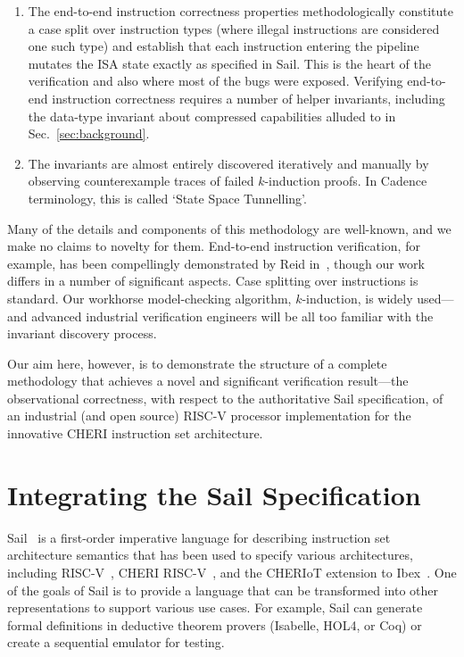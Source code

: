 \documentclass[10pt,conference]{IEEEtran}
\begin{document}
\begin{enumerate}
  \item \label{end-to-end} The end-to-end instruction correctness
    properties methodologically constitute a case split over instruction
    types (where illegal instructions are considered one such type)
    and establish that each instruction entering the
    pipeline mutates the ISA state exactly as specified in Sail. This is
    the heart of the verification and also where most of the bugs were
    exposed.  Verifying end-to-end instruction correctness requires a
    number of helper invariants, including the data-type invariant about
    compressed capabilities alluded to in Sec.~\ref{sec:background}.
  \item \label{invariant} The invariants are almost entirely discovered iteratively and
    manually by observing counterexample traces of failed $k$-induction
    proofs. In Cadence terminology, this is called `State Space Tunnelling'.
\end{enumerate}

Many of the details and components of this methodology are
well-known, and we make no claims to novelty for them. End-to-end
instruction verification, for example, has been compellingly demonstrated
by Reid in~\cite{Reid-2016-EEV}, though our work differs in a number of
significant aspects. Case splitting over instructions is
standard. Our workhorse model-checking algorithm, $k$-induction, is widely
used---and advanced industrial verification engineers will be all too
familiar with the invariant discovery process.

Our aim here, however, is to demonstrate the structure of a complete
methodology that achieves a novel and significant verification result---the
observational correctness, with respect to the authoritative Sail
specification, of an industrial (and open source) RISC-V processor
implementation for the innovative CHERI instruction set architecture.

\section{Integrating the Sail Specification}

Sail~\cite{Sail} is a first-order imperative language for describing instruction set architecture
semantics that has been used to specify various architectures, including
RISC-V~\cite{sail-risc-v}, CHERI RISC-V~\cite{cheri-risc-v}, and the CHERIoT
extension to Ibex~\cite{cheriot-sail}. One of the goals of Sail is to provide a
language that can be transformed into other representations to support
various use cases. For example, Sail can generate formal definitions in
deductive theorem provers (Isabelle, HOL4, or Coq) or create a sequential
emulator for testing.
\end{document}

